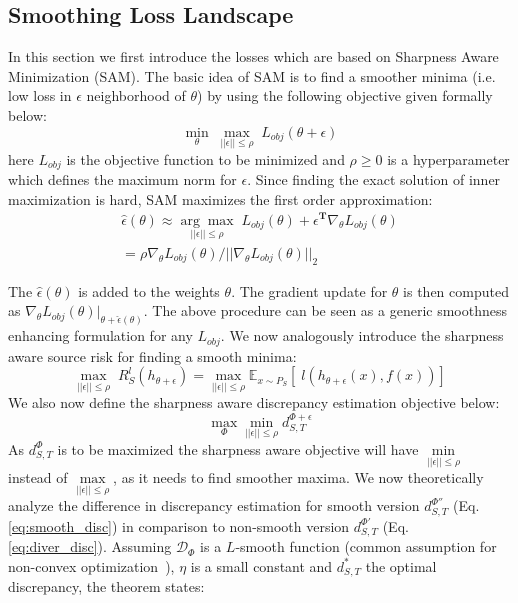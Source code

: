 \documentclass[table,dvipsnames]{article}
\theoremstyle{plain}
\theoremstyle{definition}
\theoremstyle{remark}
\begin{document}
\subsection{Smoothing Loss Landscape}
\label{sec:subopt_dis}
In this section we first introduce the losses which are based on Sharpness Aware Minimization \citep{foret2021sharpnessaware} (SAM). The basic idea of SAM is to find a smoother minima (i.e. low loss in $\epsilon$ neighborhood of $\theta$) by using the following objective given formally below:
\begin{equation}
    \underset{\theta}{\min} \;\underset{||\epsilon|| \leq \rho}{\max}\; L_{obj}(\theta + \epsilon) 
\end{equation}
here $L_{obj}$ is the objective function to be minimized and $\rho\geq0$ is a hyperparameter which defines the maximum norm for $\epsilon$. Since finding the exact solution of inner maximization is hard, SAM maximizes the first order approximation:
\begin{equation}
\begin{split}
            \hat{\epsilon}(\theta) \approx \underset{||\epsilon|| \leq \rho}{\arg \max} \;  L_{obj}(\theta) + \epsilon^{\mathbf{T}}\nabla_{\theta} L_{obj}(\theta) \\
            = \rho \nabla_{\theta} L_{obj}(\theta) / ||\nabla_{\theta} L_{obj}(\theta)||_2
\end{split}
\end{equation}


The $\hat{\epsilon}(\theta)$ is added to the weights $\theta$. The gradient update for $\theta$ is then computed as $\nabla_{\theta} L_{obj}(\theta)|_{\theta + \hat{\epsilon}(\theta)}$. The above procedure can be seen as a generic smoothness enhancing formulation for any $L_{obj}$. We now analogously introduce the sharpness aware source risk for finding a smooth minima:
\begin{equation}
      \underset{||\epsilon|| \leq \rho}{\max} \; {R}_{S}^l(h_{\theta + \epsilon}) =  
\underset{||\epsilon|| \leq \rho}{\max} \mathbb{E}_{x \sim P_S}[\; l(h_{\theta + \epsilon}(x), f(x))]
\end{equation}
We also now define the sharpness aware discrepancy estimation objective below:
\begin{equation}
    \max_{\Phi} \min_{||\epsilon|| \leq \rho} d_{S,T}^{\Phi + \epsilon}
    \label{eq:smooth_disc}
\end{equation}
As $d_{S,T}^{\Phi}$ is to be maximized the sharpness aware objective will have $\underset{||\epsilon|| \leq \rho}{\min}$ instead of $\underset{||\epsilon|| \leq \rho}{\max}$, as it needs to find smoother maxima. We now theoretically analyze the difference in discrepancy estimation for smooth version $d_{S,T}^{\Phi''}$ (Eq. \ref{eq:smooth_disc}) in comparison to non-smooth version $d_{S,T}^{\Phi'}$ (Eq. \ref{eq:diver_disc}). Assuming $\mathcal{D}_{\Phi}$ is a $L$-smooth function {(common assumption for non-convex optimization~\citep{carmon2020lower})}, 
$\eta$ is a small constant and $d_{S,T}^*$ the optimal discrepancy, the theorem states:
\end{document}
